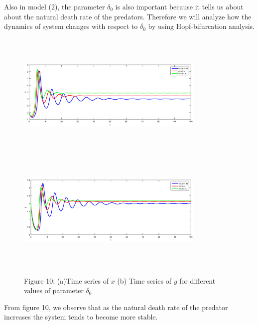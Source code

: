 \documentclass[a4paper, 10pt]{article}
\begin{document}
Also in model (2), the parameter $\delta_0$ is also important because it tells us about about the natural death rate of the predators. Therefore we will analyze how the dynamics of system changes with respect to $\delta_0$ by using Hopf-bifurcation analysis.
\begin{figure}[H]
	{\includegraphics[width=9cm, height=6cm]{17a.eps}}
	\endminipage\hfill
	{\includegraphics[width=9cm, height=6cm]{17b.eps}}
	\endminipage\hfill
	\begin{center} Figure 10: (a)Time series of $x$  (b) Time series of $y$  for different values of parameter $\delta_0$   \end{center}
\end{figure}
From figure 10, we observe that as the natural death rate of the predator increases the system tends to become more stable.
\end{document}
